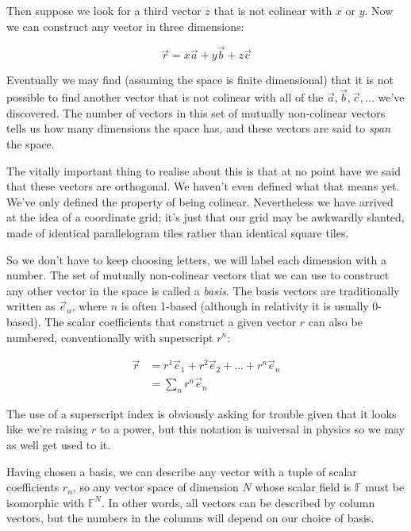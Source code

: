 Then suppose we look for a third vector $z$ that is not colinear with $x$ or $y$. Now we can construct any vector in three dimensions:

$$
\vec{r} = x \vec{a} + y \vec{b} + z \vec{c}
$$

Eventually we may find (assuming the space is finite dimensional) that it is not possible to find another vector that is not colinear with all of the $\vec{a}, \vec{b}, \vec{c}, ...$ we've discovered. The number of vectors in this set of mutually non-colinear vectors tells us how many dimensions the space has, and these vectors are said to \textit{span} the space.

The vitally important thing to realise about this is that at no point have we said that these vectors are orthogonal. We haven't even defined what that means yet. We've only defined the property of being colinear. Nevertheless we have arrived at the idea of a coordinate grid; it's just that our grid may be awkwardly slanted, made of identical parallelogram tiles rather than identical square tiles.

So we don't have to keep choosing letters, we will label each dimension with a number. The set of mutually non-colinear vectors that we can use to construct any other vector in the space is called a \textit{basis}. The basis vectors are traditionally written as $\vec{e}_n$, where $n$ is often 1-based (although in relativity it is usually 0-based). The scalar coefficients that construct a given vector $r$ can also be numbered, conventionally with superscript $r^n$:

\begin{equation}
\begin{split}
\vec{r} &= r^1 \vec{e}_1 + r^2 \vec{e}_2 + ... + r^n \vec{e}_n \\
        &= \sum_n r^n \vec{e}_n
\end{split}
\end{equation}

The use of a superscript index is obviously asking for trouble given that it looks like we're raising $r$ to a power, but this notation is universal in physics so we may as well get used to it.

Having chosen a basis, we can describe any vector with a tuple of scalar coefficients $r_n$, so any vector space of dimension $N$ whose scalar field is $\mathbb{F}$ must be isomorphic with $\mathbb{F}^N$. In other words, all vectors can be described by column vectors, but the numbers in the columns will depend on our choice of basis.

